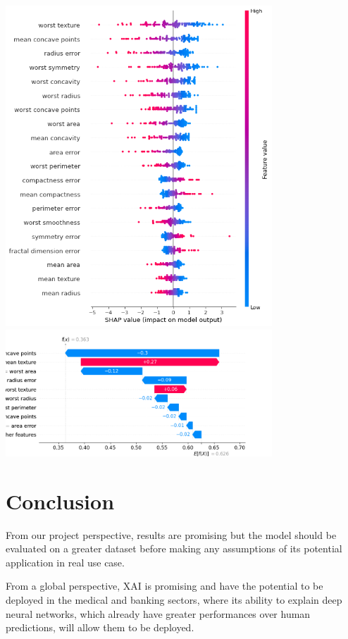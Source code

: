 \documentclass{article}
\begin{document}
\begin{center}
\includegraphics[width=10cm]{kiki-shap-summary-plot.png}
\includegraphics[width=10cm]{waterfall.png}
\end{center}
\section{Conclusion}
From our project perspective, results are promising but the model should be evaluated on a greater dataset before making any assumptions of its potential application in real use case.\par
From a global perspective, XAI is promising and have the potential to be deployed in the medical and banking sectors, where its ability to explain deep neural networks, which already have greater performances over human predictions, will allow them to be deployed.
\end{document}
